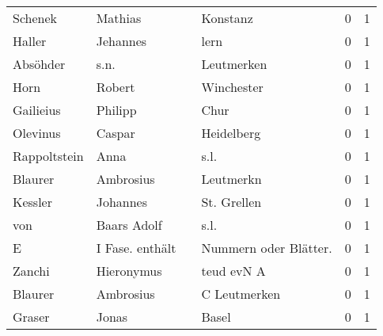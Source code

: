 \begin{tabular}{llllrr}
                  Schenek &                            Mathias &             &                                    Konstanz &          0 &         1 \\
                   Haller &                           Jehannes &             &                                        lern &          0 &         1 \\
                 Absöhder &                               s.n. &             &                                  Leutmerken &          0 &         1 \\
                     Horn &                             Robert &             &                                  Winchester &          0 &         1 \\
                Gailieius &                            Philipp &             &                                        Chur &          0 &         1 \\
                 Olevinus &                             Caspar &             &                                  Heidelberg &          0 &         1 \\
             Rappoltstein &                               Anna &             &                                        s.l. &          0 &         1 \\
                  Blaurer &                          Ambrosius &             &                                   Leutmerkn &          0 &         1 \\
                  Kessler &                           Johannes &             &                                 St. Grellen &          0 &         1 \\
                      von &                        Baars Adolf &             &                                        s.l. &          0 &         1 \\
                        E &                    I Fase. enthält &             &                      Nummern oder Blätter.  &          0 &         1 \\
                   Zanchi &                         Hieronymus &             &                                  teud evN A &          0 &         1 \\
                  Blaurer &                          Ambrosius &             &                                C Leutmerken &          0 &         1 \\
                   Graser &                              Jonas &             &                                       Basel &          0 &         1 \\

\end{tabular}
